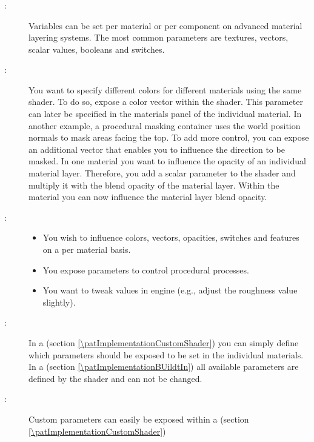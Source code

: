 \subsubsection{\parParametersVariables}\label{\parParametersVariables}
\begin{description}
	\item[\patIntent:]%
	Variables can be set per material or per component on advanced material layering systems. The most common parameters are textures, vectors, scalar values, booleans and switches.
	\item[\patMotivation:]%
	You want to specify different colors for different materials using the same shader. To do so, expose a color vector within the shader. This parameter can later be specified in the materials panel of the individual material. In another example, a procedural masking container uses the world position normals to mask areas facing the top. To add more control, you can expose an additional vector that enables you to influence the direction to be masked. In one material you want to influence the opacity of an individual material layer. Therefore, you add a scalar parameter to the shader and multiply it with the blend opacity of the material layer. Within the material you can now influence the material layer blend opacity.
	\item[\patApplicability:]\hfill
	\begin{itemize}\mynobreakpar
		\item You wish to influence colors, vectors, opacities, switches and features on a per material basis. 
		\item You expose parameters to control procedural processes.
		\item You want to tweak values in engine (e.g., adjust the roughness value slightly).
	\end{itemize}
	\item[\patImplementation:]%
		In a \emph{\patImplementationCustomShader} (section \ref{\patImplementationCustomShader}) you can simply define which parameters should be exposed to be set in the individual materials. In a  \emph{\patImplementationBUildtIn} (section \ref{\patImplementationBUildtIn}) all available parameters are defined by the shader and can not be changed. 
	\item[\patRelations:]%
	Custom parameters can easily be exposed within a \emph{\patImplementationCustomShader} (section \ref{\patImplementationCustomShader})
\end{description}


